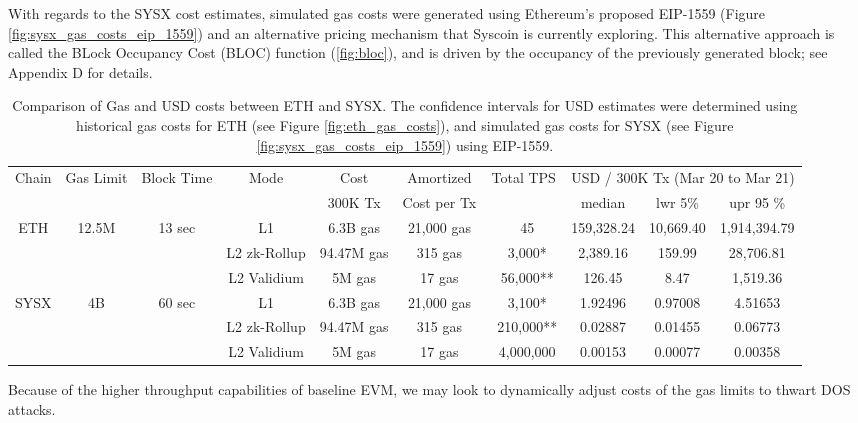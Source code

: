 \documentclass[peerreview]{ieeesyscoin}
\begin{document}
With regards to the SYSX cost estimates, simulated gas costs were generated using Ethereum's proposed EIP-1559 (Figure \ref{fig:sysx_gas_costs_eip_1559}) and an alternative pricing mechanism that Syscoin is currently exploring. This alternative approach is called the BLock Occupancy Cost (BLOC) function (\ref{fig:bloc}), and is driven by the occupancy of the previously generated block; see Appendix D for details.

\begin{table}[h!]
\centering
\begin{tabular}{ |c|c|c|c|c|c|c|c|c|c|   } 
\hline
Chain & Gas  Limit & Block Time & Mode & Cost  & Amortized  & Total TPS & \multicolumn{3}{|c|}{USD / 300K Tx (Mar 20 to Mar 21) } \\
 &  &  &  &  300K Tx  & Cost per Tx  &  & median & lwr 5\% &  upr 95 \% \\ 
\hline
\multirow{3}{*}{ETH} & \multirow{3}{*}{12.5M} & \multirow{3}{*}{13 sec} & L1 & 6.3B gas  & 21,000 gas  & ~45 & 159,328.24 & 10,669.40  & 1,914,394.79  \\ 
\multirow{3}{*}{} & \multirow{3}{*}{} & \multirow{3}{*}{} & L2 zk-Rollup & 94.47M gas  & 315 gas & ~3,000* & 2,389.16 & 159.99  & 28,706.81 \\ 
\multirow{3}{*}{} & \multirow{3}{*}{} & \multirow{3}{*}{} & L2 Validium  & 5M gas  & 17 gas & ~56,000** & 126.45 & 8.47  & 1,519.36 \\ 
\hline

\multirow{3}{*}{SYSX} & \multirow{3}{*}{4B} & \multirow{3}{*}{60 sec} & L1 & 6.3B gas  & 21,000 gas  & ~3,100*& 1.92496 & 0.97008 & 4.51653 \\ 
\multirow{3}{*}{} & \multirow{3}{*}{} & \multirow{3}{*}{} & L2 zk-Rollup & 94.47M gas  & 315 gas & ~210,000** & 0.02887 & 0.01455 & 0.06773 \\ 
\multirow{3}{*}{} & \multirow{3}{*}{} & \multirow{3}{*}{} & L2 Validium  & 5M gas  & 17 gas & ~4,000,000 & 0.00153 & 0.00077  & 0.00358 \\ 
\hline

\end{tabular}
\caption{Comparison of Gas and USD costs between ETH and SYSX. The confidence intervals for USD estimates were determined using historical gas costs for ETH (see Figure \ref{fig:eth_gas_costs}), and simulated gas costs for SYSX (see Figure \ref{fig:sysx_gas_costs_eip_1559}) using EIP-1559.}
\label{table:gas_cost_estimates}
\end{table}

Because of the higher throughput capabilities of baseline EVM, we may look to dynamically adjust costs of the gas limits \cite{Che17} to thwart DOS attacks.
\end{document}
